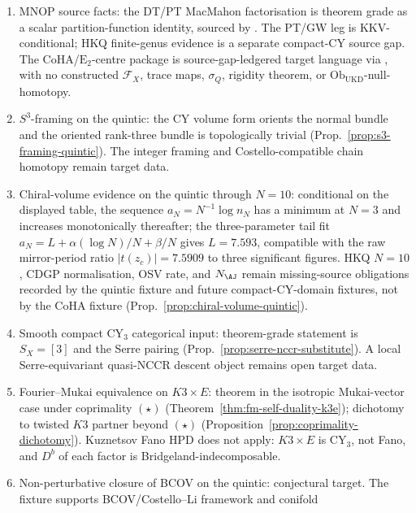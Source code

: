 \documentclass[12pt]{amsart}
\theoremstyle{remark}
\providecommand{\E}{\mathrm{E}}
\providecommand{\cF}{\mathcal{F}}
\begin{document}
\begin{enumerate}
  \item MNOP source facts: the DT/PT MacMahon factorisation is theorem
    grade as a scalar partition-function identity, sourced by
    .
    The PT/GW leg is KKV-conditional; HKQ finite-genus evidence is a
    separate compact-CY source gap. The CoHA/\(\E_2\)-centre package is
    source-gap-ledgered target language via
    ,
    with no constructed \(\cF_X\), trace maps, \(\sigma_Q\), rigidity
    theorem, or \(\mathrm{Ob}_{\mathrm{UKD}}\)-null-homotopy.
  \item \(S^3\)-framing on the quintic: the CY volume form orients the
    normal bundle and the oriented rank-three bundle is topologically
    trivial (Prop.~\ref{prop:s3-framing-quintic}).  The integer framing
    and Costello-compatible chain homotopy remain target data.
  \item Chiral-volume evidence on the quintic through $N = 10$:
    conditional on the displayed table, the sequence
    $a_N = N^{-1} \log n_N$ has a minimum at $N = 3$
    and increases monotonically thereafter; the three-parameter
    tail fit $a_N = L + \alpha (\log N)/N + \beta / N$ gives
    $L = 7.593$, compatible with the raw mirror-period ratio
    $|t(z_c)| = 7.5909$ to three significant figures. HKQ \(N=10\),
    CDGP normalisation, OSV rate, and \(N_{\AJ}\) remain missing-source
    obligations recorded by the quintic fixture and future
    compact-CY-domain fixtures, not by the CoHA fixture
    (Prop.~\ref{prop:chiral-volume-quintic}).
  \item Smooth compact CY$_3$ categorical input: theorem-grade statement is
    \(S_X=[3]\) and the Serre pairing
    (Prop.~\ref{prop:serre-nccr-substitute}).  A local
    Serre-equivariant quasi-NCCR descent object remains open target data.
  \item Fourier--Mukai equivalence on $K3 \times E$: theorem in the
    isotropic Mukai-vector case under coprimality $(\star)$
    (Theorem~\ref{thm:fm-self-duality-k3e}); dichotomy to twisted
    $K3$ partner beyond $(\star)$
    (Proposition~\ref{prop:coprimality-dichotomy}). Kuznetsov
    Fano HPD does not apply: $K3 \times E$ is CY$_3$, not Fano,
    and $D^b$ of each factor is Bridgeland-indecomposable.
  \item Non-perturbative closure of BCOV on the quintic: conjectural target.
    The fixture supports BCOV/Costello--Li framework and conifold

\end{enumerate}
\end{document}
